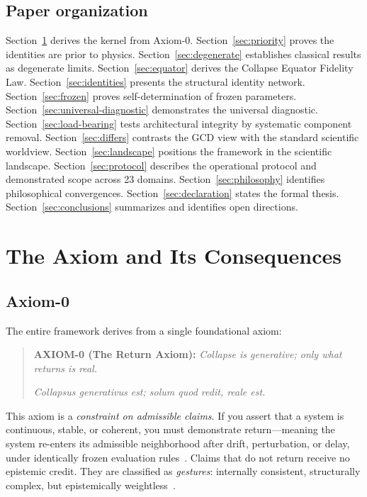 \documentclass[
  aps,
  prd,
  twocolumn,
  superscriptaddress,
  nofootinbib,
  floatfix
]{revtex4-2}
\begin{document}
\subsection{Paper organization}

Section~\ref{sec:axiom} derives the kernel from Axiom-0.
Section~\ref{sec:priority} proves the identities are prior to
physics.  Section~\ref{sec:degenerate} establishes classical results
as degenerate limits.  Section~\ref{sec:equator} derives the Collapse
Equator Fidelity Law.  Section~\ref{sec:identities} presents the
structural identity network.  Section~\ref{sec:frozen} proves
self-determination of frozen parameters.
Section~\ref{sec:universal-diagnostic} demonstrates the universal
diagnostic.  Section~\ref{sec:load-bearing} tests architectural
integrity by systematic component removal.
Section~\ref{sec:differs} contrasts the GCD view with the standard
scientific worldview.  Section~\ref{sec:landscape} positions the
framework in the scientific landscape.
Section~\ref{sec:protocol} describes the operational protocol and
demonstrated scope across 23 domains.
Section~\ref{sec:philosophy} identifies philosophical convergences.
Section~\ref{sec:declaration} states the formal thesis.
Section~\ref{sec:conclusions} summarizes and identifies open
directions.

\section{The Axiom and Its Consequences}\label{sec:axiom}

\subsection{Axiom-0}

The entire framework derives from a single foundational axiom:

\begin{quote}
\textbf{AXIOM-0 (The Return Axiom):} \emph{Collapse is generative;
only what returns is real.}

\emph{Collapsus generativus est; solum quod redit, reale est.}
\end{quote}

This axiom is a \emph{constraint on admissible claims}.  If you assert
that a system is continuous, stable, or coherent, you must demonstrate
return---meaning the system re-enters its admissible neighborhood
after drift, perturbation, or delay, under identically frozen
evaluation rules~\cite{paulus2025episteme}.  Claims that do not return
receive no epistemic credit.  They are classified as \emph{gestures}:
internally consistent, structurally complex, but epistemically
weightless~\cite{paulus2025seamreality}.
\end{document}
